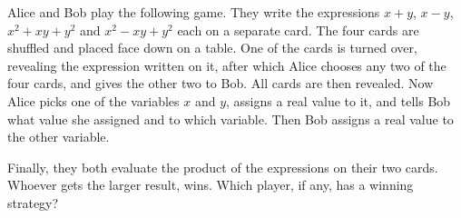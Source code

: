 Alice and Bob play the following game. They write the expressions $x + y$,  $x - y$,  $x^2+xy+y^2$ and $x^2-xy+y^2$ each on a separate card. The four cards are shuffled and placed face down on a table. One of the cards is turned over, revealing the expression written on it, after which Alice chooses any two of the four cards, and gives the other two to Bob. All cards are then revealed. Now Alice picks one of the variables $x$ and $y$,  assigns a real value to it, and tells Bob what value she assigned and to which variable. Then Bob assigns a real value to the other variable.

Finally, they both evaluate the product of the expressions on their two cards. Whoever gets the larger result, wins. Which player, if any, has a winning strategy?